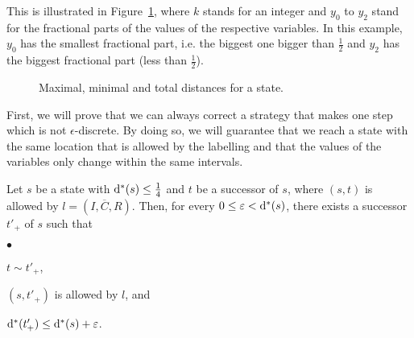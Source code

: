 \documentclass[fleqn,envcountsame]{LMCS}
\newcommand{\ie}{i.e.\xspace}
\newcommand{\ol}[1]{\ensuremath{\overline{#1}}}
\newcommand{\dleft}{\ensuremath{\mathrm{d}_l}}
\newcommand{\dright}{\ensuremath{\mathrm{d}_r}}
\begin{document}
This is illustrated in Figure~\ref{fig-total-dists}, where $k$ stands for 
an integer and $y_0$ to $y_2$ stand for the fractional parts of the values 
of the respective variables.
In this example, $y_0$ has the smallest fractional part, \ie the biggest one bigger
than $\frac 1 2$ and $y_2$ has the biggest fractional part (less than $\frac 1 2$).

\begin{figure}[b]
\begin{center}
\end{center}
\caption{Maximal, minimal and total distances for a state.}
\label{fig-total-dists}
\end{figure}

First, we will prove that we can always correct a strategy that makes
one step which is not $\epsilon$-discrete. By doing so, we will
guarantee that we reach a state with the same location that is allowed
by the labelling and that the values of the variables only change
within the same intervals.

\begin{lem}\label{discrete_succ}
Let $s$ be a state with $\mathrm{d^*}(s) \leq \frac 1 4$ and $t$ be a successor
of $s$, where $(s,t)$ is allowed by $l=(I, \ol{C}, R)$.
Then, for every $0 \leq \varepsilon < \mathrm{d^*}(s)$, there exists
a successor $t'_+$ of $s$ such that 
\begin{iteMize}{$\bullet$}
\item
  $t \sim t'_+$,
\item 
  $(s, t'_+)$ is allowed by $l$, and
\item
  $\mathrm{d^*}(t'_+) \leq \mathrm{d^*}(s) + \varepsilon$.
\end{iteMize}
\end{lem}
\end{document}

